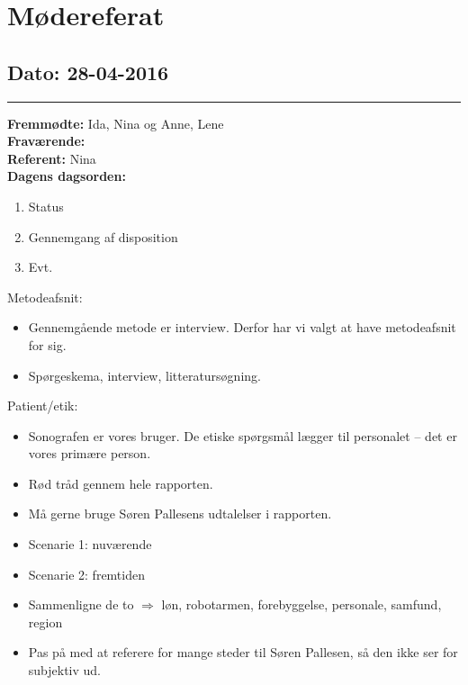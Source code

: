 \chapter{Mødereferat}

\section{Dato: 28-04-2016}
\hrule
\textbf{Fremmødte: } Ida, Nina og Anne, Lene \\
\textbf{Fraværende:} \\
\textbf{Referent: } Nina \\
\textbf{Dagens dagsorden: }
\begin{enumerate}
	\item Status
\item Gennemgang af disposition
\item Evt.
\end{enumerate}

Metodeafsnit:
\begin{itemize}
\item Gennemgående metode er interview. Derfor har vi valgt at have metodeafsnit for sig.
\item Spørgeskema, interview, litteratursøgning.
\end{itemize}
Patient/etik:
\begin{itemize}
\item Sonografen er vores bruger. De etiske spørgsmål lægger til personalet – det er vores primære person. 
\item Rød tråd gennem hele rapporten. 
\item Må gerne bruge Søren Pallesens udtalelser i rapporten. 
\item Scenarie 1: nuværende
\item Scenarie 2: fremtiden
\item Sammenligne de to $\Rightarrow$ løn, robotarmen, forebyggelse, personale, samfund, region
\item Pas på med at referere for mange steder til Søren Pallesen, så den ikke ser for subjektiv ud. 

\end{itemize}

\newpage


